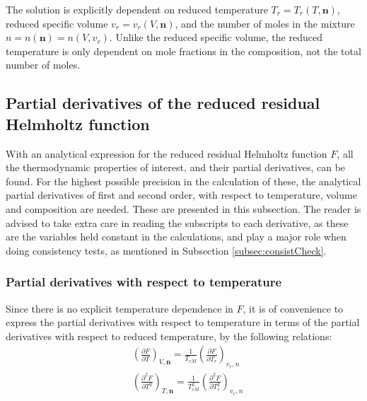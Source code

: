 \documentclass[english]{../thermomemo/thermomemo}
\numberwithin{equation}{section}
\newcommand*{\pder}[2]{\left(\frac{\partial #1}{\partial #2}\right)}
\newcommand*{\pdder}[2]{\left(\frac{\partial^2 #1}{\partial #2^2}\right)}
\begin{document}
The solution is explicitly dependent on reduced temperature $T_r = T_r(T,\textbf{n})$, reduced specific volume $v_r = v_r(V,\textbf{n})$, and the number of moles in the mixture $n = n(\textbf{n}) = n(V,v_r)$. Unlike the reduced specific volume, the reduced temperature is only dependent on mole fractions in the composition, not the total number of moles.

\subsection{Partial derivatives of the reduced residual Helmholtz function}
With an analytical expression for the reduced residual Helmholtz function $F$, all the thermodynamic properties of interest, and their partial derivatives, can be found. For the highest possible precision in the calculation of these, the analytical partial derivatives of first and second order, with respect to temperature, volume and composition are needed. These are presented in this subsection. The reader is advised to take extra care in reading the subscripts to each derivative, as these are the variables held constant in the calculations, and play a major role when doing consistency tests, as mentioned in Subsection \ref{subsec:consistCheck}.

\subsubsection*{Partial derivatives with respect to temperature}
Since there is no explicit temperature dependence in $F$, it is of convenience to express the partial derivatives with respect to temperature in terms of the partial derivatives with respect to reduced temperature, by the following relations:
\begin{align}
\label{eq:F_T}
&\pder{F}{T}_{V, \textbf{n}} = \frac{1}{T_{cM}} \pder{F}{T_r}_{v_r, n} \\
\label{eq:F_TT}
& \pdder{F}{T}_{T,\textbf{n}} = \frac{1}{T_{cM} ^2} \pdder{F}{T_r}_{v_r, n}
\end{align}
\end{document}
